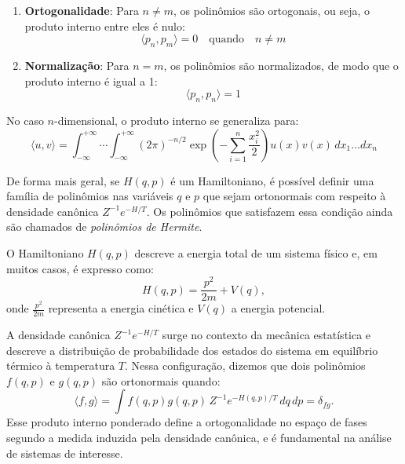 \documentclass[12pt]{article}
\begin{document}
\begin{enumerate}
    \item \textbf{Ortogonalidade}: Para $n \neq m$, os polinômios são ortogonais, ou seja, o produto interno entre eles é nulo:
    \begin{equation*}
        \langle p_n, p_m \rangle = 0 \quad \text{quando} \quad n \neq m
    \end{equation*}
    
    \item \textbf{Normalização}: Para $n = m$, os polinômios são normalizados, de modo que o produto interno é igual a 1:
    \begin{equation*}
        \langle p_n, p_n \rangle = 1
    \end{equation*}
\end{enumerate}

No caso $n$-dimensional, o produto interno se generaliza para:
\begin{equation*}
    \langle u, v \rangle = \int_{-\infty}^{+\infty} \cdots \int_{-\infty}^{+\infty} (2 \pi)^{-n/2} \exp \left(-\sum_{i=1}^n \frac{x_i^2}{2} \right) u(x) v(x) \, dx_1 \ldots dx_n
\end{equation*}

De forma mais geral, se $H(q, p)$ é um Hamiltoniano, é possível definir uma família de polinômios nas variáveis $q$ e $p$ que sejam ortonormais com respeito à densidade canônica $Z^{-1} e^{-H/T}$. Os polinômios que satisfazem essa condição ainda são chamados de \textit{polinômios de Hermite}.

O Hamiltoniano $H(q, p)$ descreve a energia total de um sistema físico e, em muitos casos, é expresso como:
\begin{equation*}
    H(q, p) = \frac{p^2}{2m} + V(q),
\end{equation*}
onde $\frac{p^2}{2m}$ representa a energia cinética e $V(q)$ a energia potencial.

A densidade canônica $Z^{-1} e^{-H/T}$ surge no contexto da mecânica estatística e descreve a distribuição de probabilidade dos estados do sistema em equilíbrio térmico à temperatura $T$. Nessa configuração, dizemos que dois polinômios $f(q, p)$ e $g(q, p)$ são ortonormais quando:
\begin{equation*}
    \langle f, g \rangle = \int f(q, p) g(q, p) \, Z^{-1} e^{-H(q, p)/T} \, dq \, dp = \delta_{fg}.
\end{equation*}
Esse produto interno ponderado define a ortogonalidade no espaço de fases segundo a medida induzida pela densidade canônica, e é fundamental na análise de sistemas de interesse.
\end{document}
